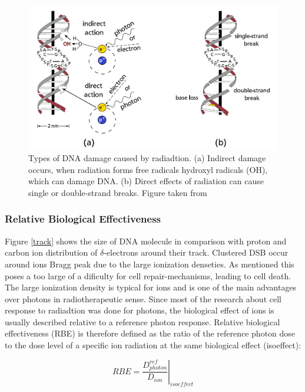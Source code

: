 \documentclass[type=dr, dr=rernat, accentcolor=tud7b,colorbacktitle, bigchapter, openright, twoside, 12pt ]{tudthesis}
\begin{document}
\begin{figure}[H]
\begin{center}
\includegraphics[scale=0.5]{./Images/SSB_DSB.png}
\caption{Types of DNA damage caused by radiadtion. (a) Indirect damage occurs, when radiation forms free radicals hydroxyl radicals (OH), which can damage DNA. (b) Direct effects of radiation can cause single or double-strand breaks. 
Figure taken from \cite{Richter2012}}
\label{ida}
\end{center}
\end{figure}


\subsubsection{Relative Biological Effectiveness}

Figure \ref{track} shows the size of DNA molecule in comparison with proton and carbon ion distribution of $\delta$-electrons around their track. Clustered DSB occur around ions Bragg peak due to the large ionization denseties. As mentioned
this poses a too large of a dificulty for cell repair-mechanisms, leading to cell death. The large ionization density is typical for ions and is one of the main advantages over photons in radiotherapeutic sense. Since most of the research about
cell response to radiadtion was done for photons, the biological effect of ions is usually described relative to a reference photon response. Relative biological effectiveness (RBE) is therefore defined as the ratio of the reference 
photon dose to the dose level of a specific ion radiation at the same biological effect (isoeffect):

\begin{equation}
 RBE = \left.\frac{D^{ref}_{photon}}{D_{ion}} \right|_{isoeffect}
\end{equation}
\end{document}
